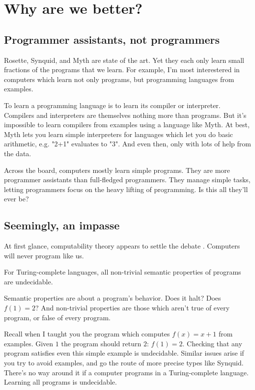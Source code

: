 \section{Why are we better?}

\subsection{Programmer assistants, not programmers}
Rosette, Synquid, and Myth are state of the art. Yet they each only learn small fractions of the programs that we learn. For example, I'm most interestered in computers which learn not only programs, but programming languages from examples. 

To learn a programming language is to learn its compiler or interpreter. Compilers and interpreters are themselves nothing more than programs. But it's impossible to learn compilers from examples using a language like Myth. At best, Myth lets you learn simple interpreters for languages which let you do basic arithmetic, e.g. "2+1" evaluates to "3". And even then, only with lots of help from the data. 

Across the board, computers mostly learn simple programs. They are more programmer assistants than full-fledged programmers. They manage simple tasks, letting programmers focus on the heavy lifting of programming. Is this all they'll ever be?
\subsection{Seemingly, an impasse}

At first glance, computability theory appears to settle the debate \cite{sipser2006introduction}. Computers will never program like us.
\begin{theorem}
For Turing-complete languages, all non-trivial semantic properties of programs are undecidable.
\end{theorem}
Semantic properties are about a program's behavior. Does it halt? Does $f(1) = 2$? And non-trivial properties are those which aren't true of every program, or false of every program. 

Recall when I taught you the program which computes $f(x) = x + 1$ from examples. Given $1$ the program should return $2$: $f(1) = 2$. Checking that any program satisfies even this simple example is undecidable. Similar issues arise if you try to avoid examples, and go the route of more precise types like Synquid. There's no way around it if a computer programs in a Turing-complete language. Learning all programs is undecidable.

